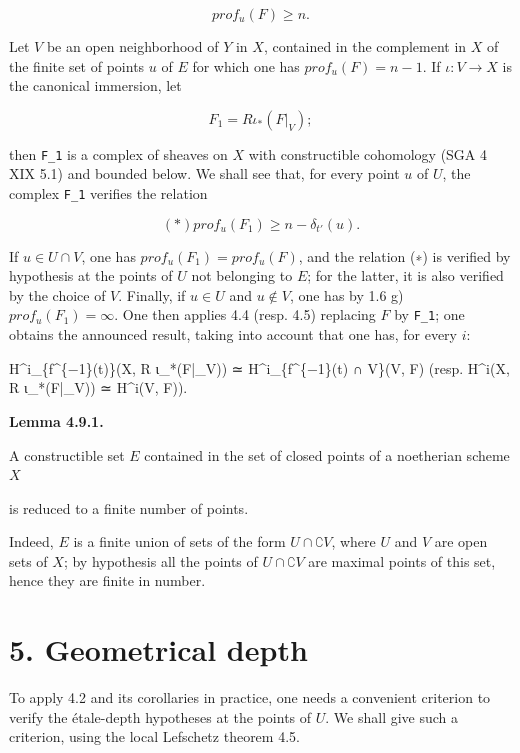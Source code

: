 \documentclass[
  11pt,
  a4paper,
]{book}
\newenvironment{Shaded}{}{}
\newcommand{\NormalTok}[1]{#1}
\begin{document}
\[ prof_{u}(F) \geqslant n. \]

Let \(V\) be an open neighborhood of \(Y\) in \(X\), contained in the
complement in \(X\) of the finite set of points \(u\) of \(E\) for which
one has \(prof_{u}(F) = n - 1\). If \(\iota : V \to X\) is the canonical
immersion, let

\[ F_{1} = R \iota_{*}(F|_{V}); \]

then \texttt{F\_1} is a complex of sheaves on \(X\) with constructible
cohomology (SGA 4 XIX 5.1) and bounded below. We shall see that, for
every point \(u\) of \(U\), the complex \texttt{F\_1} verifies the
relation

\[ (\ast) prof_{u}(F_{1}) \geqslant n - \delta_{t'}(u). \]

If \(u \in U \cap V\), one has \(prof_{u}(F_{1}) = prof_{u}(F)\), and
the relation (∗) is verified by hypothesis at the points of \(U\) not
belonging to \(E\); for the latter, it is also verified by the choice of
\(V\). Finally, if \(u \in U\) and \(u \notin V\), one has by 1.6 g)
\(prof_{u}(F_{1}) = \infty\). One then applies 4.4 (resp. 4.5) replacing
\(F\) by \texttt{F\_1}; one obtains the announced result, taking into
account that one has, for every \(i\):

\begin{Shaded}
\begin{Highlighting}[]
\NormalTok{H\^{}i\_\{f\^{}\{−1\}(t)\}(X, R ι\_*(F|\_V)) ≃ H\^{}i\_\{f\^{}\{−1\}(t) ∩ V\}(V, F)  (resp. H\^{}i(X, R ι\_*(F|\_V)) ≃ H\^{}i(V, F)).}
\end{Highlighting}
\end{Shaded}

\textbf{Lemma 4.9.1.}

A constructible set \(E\) contained in the set of closed points of a
noetherian scheme \(X\)

is reduced to a finite number of points.

Indeed, \(E\) is a finite union of sets of the form
\(U \cap \complement V\), where \(U\) and \(V\) are open sets of \(X\);
by hypothesis all the points of \(U \cap \complement V\) are maximal
points of this set, hence they are finite in number.

\section{5. Geometrical depth}\label{geometrical-depth}

To apply 4.2 and its corollaries in practice, one needs a convenient
criterion to verify the étale-depth hypotheses at the points of \(U\).
We shall give such a criterion, using the local Lefschetz theorem 4.5.
\end{document}

